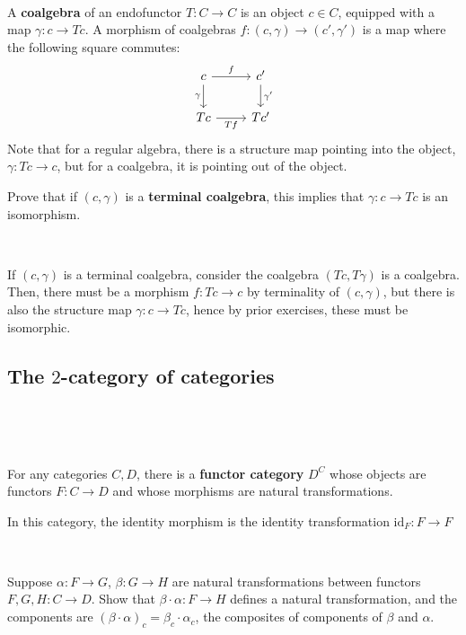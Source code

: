 \documentclass{article}
\begin{document}
\begin{exercise}[1.6.vi]
\

A \textbf{coalgebra} of an endofunctor $T: C \to C$ is an object $c \in C$, equipped with a map $\gamma: c \to Tc$. A morphism of coalgebras $f: (c, \gamma) \to (c', \gamma')$ is a map where the following square commutes: \[\begin{tikzcd}
    c & c'\\
    Tc & Tc'
    \arrow[from=1-1, to=1-2, "f"]
    \arrow[from=1-1,to=2-1, "\gamma"']
    \arrow[from=1-2, to=2-2, "\gamma'"]
    \arrow[from=2-1, to=2-2, "Tf"']
\end{tikzcd}\]Note that for a regular algebra, there is a structure map pointing into the object, $\gamma: Tc \to c$, but for a coalgebra, it is pointing out of the object.

Prove that if $(c,\gamma)$ is a \textbf{terminal coalgebra}, this implies that $\gamma: c \to Tc$ is an isomorphism. 
\end{exercise}

\begin{solution}
\

If $(c, \gamma)$ is a terminal coalgebra, consider the coalgebra $(Tc, T\gamma)$ is a coalgebra. Then, there must be a morphism $f: Tc \to c$ by terminality of $(c, \gamma)$, but there is also the structure map $\gamma: c \to Tc$, hence by prior exercises, these must be isomorphic.
\end{solution}

\subsection{The $2$-category of categories}
\

\begin{definition}
\

For any categories $C, D$, there is a \textbf{functor category} $D^C$ whose objects are functors $F: C \to D$ and whose morphisms are natural transformations. 

In this category, the identity morphism is the identity transformation $\text{id}_F: F \to F$
\end{definition}

\begin{lemma}
\

Suppose $\alpha: F \to G$, $\beta:G \to H$ are natural transformations between functors $F, G, H: C \to D$. Show that $\beta \cdot \alpha: F \to H$ defines a natural transformation, and the components are $(\beta \cdot \alpha)_c = \beta_c \cdot \alpha_c$, the composites of components of $\beta$ and $\alpha$.
\end{lemma}
\end{document}
